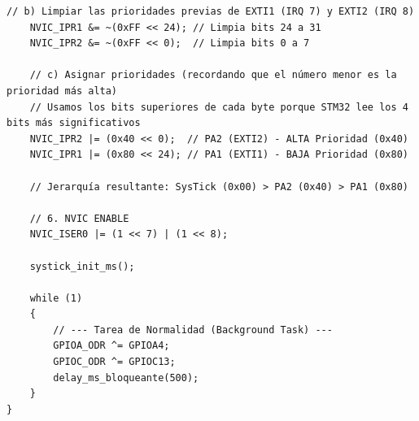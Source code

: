\begin{lstlisting}[caption={Configuración inicial en main.c}, label={cod:main}]
    // b) Limpiar las prioridades previas de EXTI1 (IRQ 7) y EXTI2 (IRQ 8)
    NVIC_IPR1 &= ~(0xFF << 24); // Limpia bits 24 a 31
    NVIC_IPR2 &= ~(0xFF << 0);  // Limpia bits 0 a 7

    // c) Asignar prioridades (recordando que el número menor es la prioridad más alta)
    // Usamos los bits superiores de cada byte porque STM32 lee los 4 bits más significativos
    NVIC_IPR2 |= (0x40 << 0);  // PA2 (EXTI2) - ALTA Prioridad (0x40)
    NVIC_IPR1 |= (0x80 << 24); // PA1 (EXTI1) - BAJA Prioridad (0x80)

    // Jerarquía resultante: SysTick (0x00) > PA2 (0x40) > PA1 (0x80)

    // 6. NVIC ENABLE
    NVIC_ISER0 |= (1 << 7) | (1 << 8); 

    systick_init_ms();

    while (1)
    {
        // --- Tarea de Normalidad (Background Task) ---
        GPIOA_ODR ^= GPIOA4; 
        GPIOC_ODR ^= GPIOC13;
        delay_ms_bloqueante(500); 
    }
}
\end{lstlisting}

